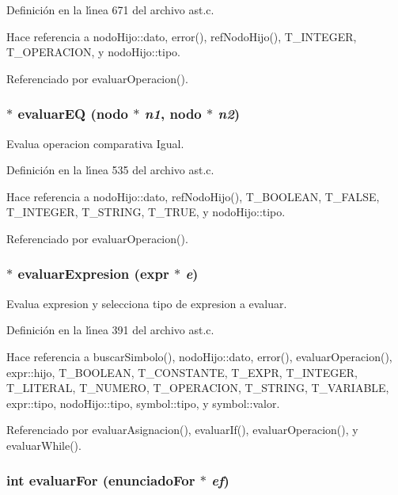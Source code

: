 Definici\'{o}n en la l\'{\i}nea 671 del archivo ast.c.

Hace referencia a nodo\-Hijo::dato, error(), ref\-Nodo\-Hijo(), T\_\-INTEGER, T\_\-OPERACION, y nodo\-Hijo::tipo.

Referenciado por evaluar\-Operacion().
\subsubsection{$\ast$ evaluar\-EQ ({\bf nodo} $\ast$ {\em n1}, {\bf nodo} $\ast$ {\em n2})}\label{ast_8c_a29}


Evalua operacion comparativa Igual. 



Definici\'{o}n en la l\'{\i}nea 535 del archivo ast.c.

Hace referencia a nodo\-Hijo::dato, ref\-Nodo\-Hijo(), T\_\-BOOLEAN, T\_\-FALSE, T\_\-INTEGER, T\_\-STRING, T\_\-TRUE, y nodo\-Hijo::tipo.

Referenciado por evaluar\-Operacion().
\subsubsection{$\ast$ evaluar\-Expresion ({\bf expr} $\ast$ {\em e})}\label{ast_8c_a25}


Evalua expresion y selecciona tipo de expresion a evaluar. 



Definici\'{o}n en la l\'{\i}nea 391 del archivo ast.c.

Hace referencia a buscar\-Simbolo(), nodo\-Hijo::dato, error(), evaluar\-Operacion(), expr::hijo, T\_\-BOOLEAN, T\_\-CONSTANTE, T\_\-EXPR, T\_\-INTEGER, T\_\-LITERAL, T\_\-NUMERO, T\_\-OPERACION, T\_\-STRING, T\_\-VARIABLE, expr::tipo, nodo\-Hijo::tipo, symbol::tipo, y symbol::valor.

Referenciado por evaluar\-Asignacion(), evaluar\-If(), evaluar\-Operacion(), y evaluar\-While().
\subsubsection{\setlength{\rightskip}{0pt plus 5cm}int evaluar\-For ({\bf enunciado\-For} $\ast$ {\em ef})}\label{ast_8c_a41}



